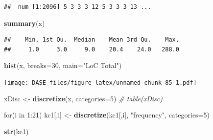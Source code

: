 \documentclass[]{book}
\newenvironment{Shaded}{\begin{snugshade}}{\end{snugshade}}
\newcommand{\KeywordTok}[1]{\textcolor[rgb]{0.13,0.29,0.53}{\textbf{{#1}}}}
\newcommand{\DataTypeTok}[1]{\textcolor[rgb]{0.13,0.29,0.53}{{#1}}}
\newcommand{\DecValTok}[1]{\textcolor[rgb]{0.00,0.00,0.81}{{#1}}}
\newcommand{\StringTok}[1]{\textcolor[rgb]{0.31,0.60,0.02}{{#1}}}
\newcommand{\CommentTok}[1]{\textcolor[rgb]{0.56,0.35,0.01}{\textit{{#1}}}}
\newcommand{\NormalTok}[1]{{#1}}
\begin{document}
\begin{Shaded}
\end{Shaded}

\begin{verbatim}
##  num [1:2096] 5 3 3 3 12 5 3 3 3 13 ...
\end{verbatim}

\begin{Shaded}
\begin{Highlighting}[]
\KeywordTok{summary}\NormalTok{(x)}
\end{Highlighting}
\end{Shaded}

\begin{verbatim}
##    Min. 1st Qu.  Median    Mean 3rd Qu.    Max. 
##     1.0     3.0     9.0    20.4    24.0   288.0
\end{verbatim}

\begin{Shaded}
\begin{Highlighting}[]
\KeywordTok{hist}\NormalTok{(x, }\DataTypeTok{breaks=}\DecValTok{30}\NormalTok{, }\DataTypeTok{main=}\StringTok{"LoC Total"}\NormalTok{)}
\end{Highlighting}
\end{Shaded}

\texttt{[image: DASE\_files/figure-latex/unnamed-chunk-85-1.pdf]}

\begin{Shaded}
\begin{Highlighting}[]
 \NormalTok{xDisc <-}\StringTok{ }\KeywordTok{discretize}\NormalTok{(x, }\DataTypeTok{categories=}\DecValTok{5}\NormalTok{)}
\CommentTok{# table(xDisc)}

 \NormalTok{for(i in }\DecValTok{1}\NormalTok{:}\DecValTok{21}\NormalTok{) kc1[,i] <-}\StringTok{ }\KeywordTok{discretize}\NormalTok{(kc1[,i],  }\StringTok{"frequency"}\NormalTok{, }\DataTypeTok{categories=}\DecValTok{5}\NormalTok{)}

\KeywordTok{str}\NormalTok{(kc1)}
\end{Highlighting}
\end{Shaded}
\end{document}
